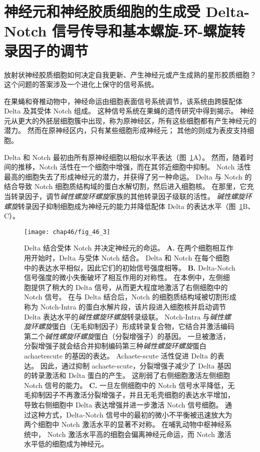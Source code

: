 \section{神经元和神经胶质细胞的生成受 Delta-Notch 信号传导和基本螺旋-环-螺旋转录因子的调节}

放射状神经胶质细胞如何决定自我更新、产生神经元或产生成熟的星形胶质细胞？
这个问题的答案涉及一个进化上保守的信号系统。


在果蝇和脊椎动物中，神经命运由细胞表面信号系统调节，该系统由跨膜配体 Delta 及其受体 Notch 组成。
这种信号系统在果蝇的遗传研究中得到揭示。
神经元从更大的外胚层细胞簇中出现，称为原神经区，所有这些细胞都有产生神经元的潜力。
然而在原神经区内，只有某些细胞形成神经元；
其他的则成为表皮支持细胞。 


Delta 和 Notch 最初由所有原神经细胞以相似水平表达（图~\ref{fig:46_3}A）。
然而，随着时间的推移，Notch 活性在一个细胞中增强，而在其邻近细胞中抑制。
Notch 活性最高的细胞失去了形成神经元的潜力，并获得了另一种命运。
Delta 与 Notch 的结合导致 Notch 细胞质结构域的蛋白水解切割，然后进入细胞核。
在那里，它充当转录因子，调节\textit{碱性螺旋环螺旋}家族的其他转录因子级联的活性。
\textit{碱性螺旋环螺旋}转录因子抑制细胞成为神经元的能力并降低配体 Delta 的表达水平（图~\ref{fig:46_3}B、C）。


\begin{figure}[htbp]
	\centering
	\texttt{[image: chap46/fig\_46\_3]}
	\caption{Delta 结合受体 Notch 并决定神经元的命运。
		\textbf{A.} 在两个细胞相互作用开始时，Delta 与受体 Notch 结合。
		Delta 和 Notch 在每个细胞中的表达水平相似，因此它们的初始信号强度相等。
		\textbf{B.} Delta-Notch 信号强度的微小失衡破坏了相互作用的对称性。
		在本例中，左侧细胞提供了稍大的 Delta 信号，从而更大程度地激活了右侧细胞中的 Notch 信号。
		在与 Delta 结合后，Notch 的细胞质结构域被切割形成称为 Notch-Intra 的蛋白水解片段，该片段进入细胞核并启动调节 Delta 表达水平的\textit{碱性螺旋环螺旋}转录级联。
		Notch-Intra 与\textit{碱性螺旋环螺旋}蛋白（无毛抑制因子）形成转录复合物，它结合并激活编码第二个\textit{碱性螺旋环螺旋}蛋白（分裂增强子）的基因。
		一旦被激活，分裂增强子就会结合并抑制编码第三种\textit{碱性螺旋环螺旋}蛋白 achaetescute 的基因的表达。
		Achaete-scute 活性促进 Delta 的表达。
		因此，通过抑制 achaete-scute，分裂增强子减少了 Delta 基因的转录激活和 Delta 蛋白的产生。
		这削弱了右侧细胞激活左侧细胞 Notch 信号的能力。
		\textbf{C.} 一旦左侧细胞中的 Notch 信号水平降低，无毛抑制因子不再激活分裂增强子，并且无毛壳细胞的表达水平增加，导致右侧细胞中 Delta 表达增强并进一步激活 Notch 信号细胞。
		通过这种方式，Delta-Notch 信号中的最初的微小不平衡被迅速放大为两个细胞中 Notch 激活水平的显著不对称。
		在哺乳动物中枢神经系统中， Notch 激活水平高的细胞会偏离神经元命运，而 Notch 激活水平低的细胞成为神经元。}
	\label{fig:46_3}
\end{figure}


